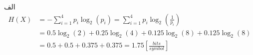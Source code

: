 \SubProblem
{الف}
{
\begin{equation*}
\begin{aligned}
    H(X)    & = -\sum_{i=1}^{4}p_i\log_2(p_i)
            = \sum_{i=1}^{4}p_i\log_2(\frac{1}{p_i})\\
            & = 0.5\log_2(2)+0.25\log_2(4)+0.125\log_2(8)+0.125\log_2(8)\\
            & = 0.5+0.5+0.375+0.375=1.75 [\frac{bits}{symbol}]
\end{aligned}
\end{equation*}
}